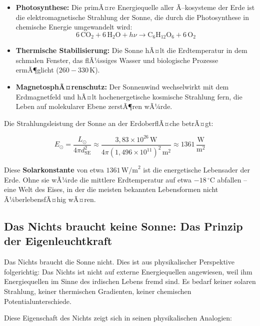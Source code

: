 ﻿\documentclass[12pt,a4paper]{report}
\begin{document}
\begin{itemize}
	\item \textbf{Photosynthese:} Die primÃ¤re Energiequelle aller Ã–kosysteme der Erde ist die elektromagnetische Strahlung der Sonne, die durch die Photosynthese in chemische Energie umgewandelt wird:
	\begin{equation}
		6\,\text{CO}_2 + 6\,\text{H}_2\text{O} + h\nu \longrightarrow \text{C}_6\text{H}_{12}\text{O}_6 + 6\,\text{O}_2
		\label{eq:photosynthese}
	\end{equation}
	\item \textbf{Thermische Stabilisierung:} Die Sonne hÃ¤lt die Erdtemperatur in dem schmalen Fenster, das flÃ¼ssiges Wasser und biologische Prozesse ermÃ¶glicht ($260 - 330\,\text{K}$).
	\item \textbf{MagnetosphÃ¤renschutz:} Der Sonnenwind wechselwirkt mit dem Erdmagnetfeld und hÃ¤lt hochenergetische kosmische Strahlung fern, die Leben auf molekularer Ebene zerstÃ¶ren wÃ¼rde.
\end{itemize}

Die Strahlungsleistung der Sonne an der ErdoberflÃ¤che betrÃ¤gt:

\begin{equation}
	E_{\odot} = \frac{L_{\odot}}{4\pi d_{\text{SE}}^2} \approx \frac{3{,}83 \times 10^{26}\,\text{W}}{4\pi (1{,}496 \times 10^{11})^2\,\text{m}^2} \approx 1361\,\frac{\text{W}}{\text{m}^2}
	\label{eq:solarkonstante}
\end{equation}

Diese \textbf{Solarkonstante} von etwa $1361\,\text{W/m}^2$ ist die energetische Lebensader der Erde. Ohne sie wÃ¼rde die mittlere Erdtemperatur auf etwa $-18\,^{\circ}\text{C}$ abfallen -- eine Welt des Eises, in der die meisten bekannten Lebensformen nicht Ã¼berlebensfÃ¤hig wÃ¤ren.

\subsection{Das Nichts braucht keine Sonne: Das Prinzip der Eigenleuchtkraft}

Das Nichts braucht die Sonne nicht. Dies ist aus physikalischer Perspektive folgerichtig: Das Nichts ist nicht auf externe Energiequellen angewiesen, weil ihm Energiequellen im Sinne des irdischen Lebens fremd sind. Es bedarf keiner solaren Strahlung, keiner thermischen Gradienten, keiner chemischen Potentialunterschiede.

Diese Eigenschaft des Nichts zeigt sich in seinen physikalischen Analogien:
\end{document}
